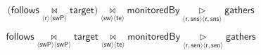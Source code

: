 \documentclass[a4paper,10pt]{article}
\newcommand{\tuple}[1]{\langle #1 \rangle}
\newcommand{\joinsymbol}{\bowtie}
\newcommand{\antijoinsymbol}{\, \triangleright \,}
\newcommand{\join}[2]{\!\underset{\tuple{\mathsf{#1}} \tuple{\mathsf{#2}}}{\joinsymbol}\!}
\newcommand{\antijoin}[2]{\!\underset{\tuple{\mathsf{#1}} \tuple{\mathsf{#2}}}{\antijoinsymbol}\!}
\newcommand{\relation}[1]{\mathsf{#1}}
\begin{document}

$$\Big(\relation{follows} \join{r}{swP} \relation{target}\Big) \join{sw}{te} \relation{monitoredBy} \antijoin{\relation{r,sns}}{\relation{r,sns}} \relation{gathers}$$

$$\relation{follows} \join{swP}{swP} \relation{target} \join{sw}{te} \relation{monitoredBy} \antijoin{r,sen}{r,sen} \relation{gathers}$$
\end{document}
